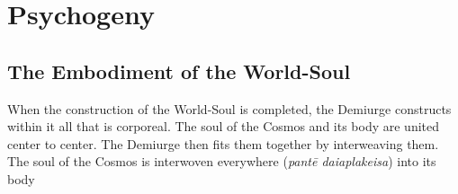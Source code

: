 
\chapter{Psychogeny} %
\label{cha:psychogeny}

\section{The Embodiment of the World-Soul} %
\label{sec:the_embodiment_of_the_world_soul}

When the construction of the World-Soul is completed, the Demiurge constructs within it all that is corporeal. The soul of the Cosmos and its body are united center to center. The Demiurge then fits them together by interweaving them. The soul of the Cosmos is interwoven everywhere (\emph{pantē daiaplakeisa}) into its body



